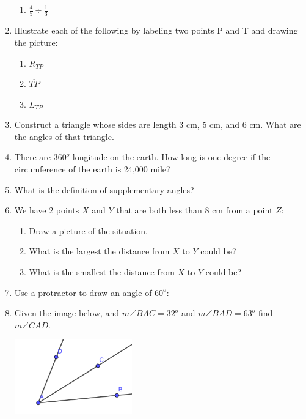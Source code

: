 \documentclass[12pt]{article}
\begin{document}
\begin{enumerate}
\begin{enumerate}
		\item $\frac{4}{5} \div \frac{1}{3}$
	\end{enumerate}
	\item Illustrate each of the following by labeling two points P and T and drawing the picture:
	\begin{enumerate}
		\item $R_{TP}$
		\item $\overline{TP}$
		\item $L_{TP}$
	\end{enumerate}
	\item Construct a triangle whose sides are length 3 cm, 5 cm, and 6 cm.  What are the angles of that triangle.
%
\item There are $360^o$ longitude on the earth.  How long is one degree if the circumference of the earth is 24,000 mile?
\item What is the definition of supplementary angles?

	\item We have 2 points $X$ and $Y$ that are both less than 8 cm from a point $Z$:
	\begin{enumerate}
		\item Draw a picture of the situation.
		\item What is the largest the distance from $X$ to $Y$ could be?
		\item What is the smallest the distance from $X$ to $Y$ could be?
	\end{enumerate}
	\item Use a protractor to draw an angle of $60^o$:
	\item Given the image below, and $m\angle BAC = 32^o$ and $m\angle BAD = 63^o$ find $m\angle CAD$.
	
	\includegraphics[width=2in]{geom-test1-review-img2.png}

\end{enumerate}
\end{document}

